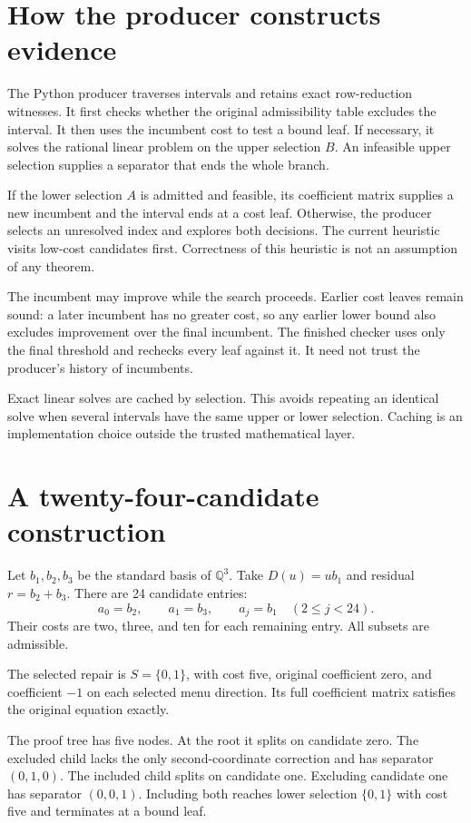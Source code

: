 \documentclass[11pt,letterpaper,oneside,openany]{book}
\theoremstyle{quiet}
\newcommand{\Q}{\mathbb{Q}}
\begin{document}
\section{How the producer constructs evidence}

The Python producer traverses intervals and retains exact row-reduction witnesses. It first checks whether the original admissibility table excludes the interval. It then uses the incumbent cost to test a bound leaf. If necessary, it solves the rational linear problem on the upper selection $B$. An infeasible upper selection supplies a separator that ends the whole branch.

If the lower selection $A$ is admitted and feasible, its coefficient matrix supplies a new incumbent and the interval ends at a cost leaf. Otherwise, the producer selects an unresolved index and explores both decisions. The current heuristic visits low-cost candidates first. Correctness of this heuristic is not an assumption of any theorem.

The incumbent may improve while the search proceeds. Earlier cost leaves remain sound: a later incumbent has no greater cost, so any earlier lower bound also excludes improvement over the final incumbent. The finished checker uses only the final threshold and rechecks every leaf against it. It need not trust the producer's history of incumbents.

Exact linear solves are cached by selection. This avoids repeating an identical solve when several intervals have the same upper or lower selection. Caching is an implementation choice outside the trusted mathematical layer.

\section{A twenty-four-candidate construction}

Let $b_1,b_2,b_3$ be the standard basis of $\Q^3$. Take $D(u)=ub_1$ and residual $r=b_2+b_3$. There are 24 candidate entries:
\[
 a_0=b_2,\qquad a_1=b_3,\qquad a_j=b_1\quad(2\leq j<24).
\]
Their costs are two, three, and ten for each remaining entry. All subsets are admissible.

The selected repair is $S=\{0,1\}$, with cost five, original coefficient zero, and coefficient $-1$ on each selected menu direction. Its full coefficient matrix satisfies the original equation exactly.

The proof tree has five nodes. At the root it splits on candidate zero. The excluded child lacks the only second-coordinate correction and has separator $(0,1,0)$. The included child splits on candidate one. Excluding candidate one has separator $(0,0,1)$. Including both reaches lower selection $\{0,1\}$ with cost five and terminates at a bound leaf.
\end{document}
